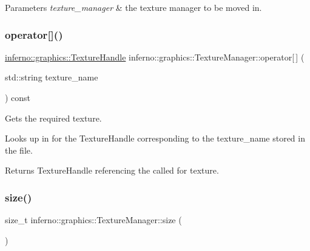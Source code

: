 \begin{DoxyParams}{Parameters}
{\em texture\+\_\+manager} & the texture manager to be moved in. \\
\hline
\end{DoxyParams}
\mbox{\label{classinferno_1_1graphics_1_1_texture_manager_a419b62740d0cbff686820b9b4ccc95e2}} 
\subsubsection{\texorpdfstring{operator[]()}{operator[]()}}
{\footnotesize\ttfamily \mbox{\hyperlink{namespaceinferno_1_1graphics_a9d719bfbfedd17b9ace9b8d603ab5a38}{inferno\+::graphics\+::\+Texture\+Handle}} inferno\+::graphics\+::\+Texture\+Manager\+::operator\mbox{[}$\,$\mbox{]} (\begin{DoxyParamCaption}\item[{std\+::string}]{texture\+\_\+name }\end{DoxyParamCaption}) const}



Gets the required texture. 

Looks up in for the Texture\+Handle corresponding to the texture\+\_\+name stored in the file. \begin{DoxyReturn}{Returns}
Texture\+Handle referencing the called for texture. 
\end{DoxyReturn}
\mbox{\label{classinferno_1_1graphics_1_1_texture_manager_a7b5b7ee8f6c1a65f63de017a933549ef}} 
\subsubsection{\texorpdfstring{size()}{size()}}
{\footnotesize\ttfamily size\+\_\+t inferno\+::graphics\+::\+Texture\+Manager\+::size (\begin{DoxyParamCaption}{ }\end{DoxyParamCaption})\hspace{0.3cm}{\ttfamily [inline]}}



